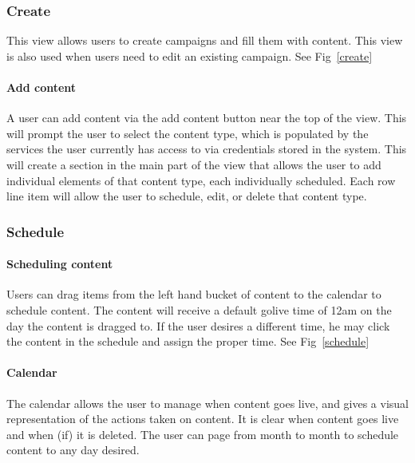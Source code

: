 \documentclass{report}
\begin{document}
\subsubsection{Create}
This view allows users to create campaigns and fill them with content.
This view is also used when users need to edit an existing
campaign. See Fig~\ref{create}
\paragraph{Add content}
A user can add content via the add content button near the top of the
view.  This will prompt the user to select the content type, which is
populated by the services the user currently has access to via
credentials stored in the system. This will create a section in the
main part of the view that allows the user to add individual elements
of that content type, each individually scheduled.  Each row line item
will allow the user to schedule, edit, or delete that content type.
\subsubsection{Schedule}
\paragraph{Scheduling content}
Users can drag items from the left hand bucket of content to the
calendar to schedule content.  The content will receive a default
golive time of 12am on the day the content is dragged to.  If the user
desires a different time, he may click the content in the schedule and
assign the proper time. See Fig~\ref{schedule}
\paragraph{Calendar}
The calendar allows the user to manage when content goes live, and
gives a visual representation of the actions taken on content.  It is
clear when content goes live and when (if) it is deleted.  The user
can page from month to month to schedule content to any day desired.
\end{document}
